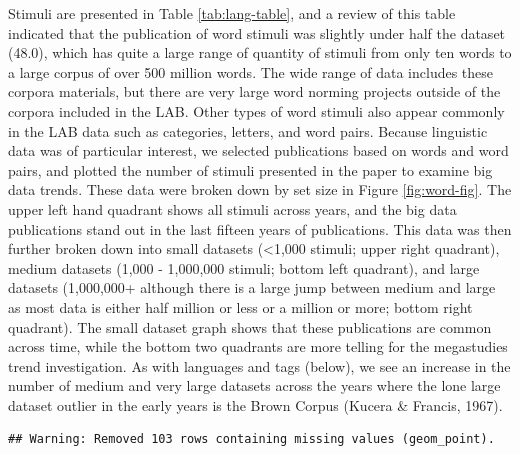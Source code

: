 \documentclass[english,man]{apa6}
\theoremstyle{definition}
\theoremstyle{definition}
\theoremstyle{definition}
\theoremstyle{remark}
\begin{document}
Stimuli are presented in Table \ref{tab:lang-table}, and a review of
this table indicated that the publication of word stimuli was slightly
under half the dataset (48.0), which has quite a large range of quantity
of stimuli from only ten words to a large corpus of over 500 million
words. The wide range of data includes these corpora materials, but
there are very large word norming projects outside of the corpora
included in the LAB. Other types of word stimuli also appear commonly in
the LAB data such as categories, letters, and word pairs. Because
linguistic data was of particular interest, we selected publications
based on words and word pairs, and plotted the number of stimuli
presented in the paper to examine big data trends. These data were
broken down by set size in Figure \ref{fig:word-fig}. The upper left
hand quadrant shows all stimuli across years, and the big data
publications stand out in the last fifteen years of publications. This
data was then further broken down into small datasets (\textless{}1,000
stimuli; upper right quadrant), medium datasets (1,000 - 1,000,000
stimuli; bottom left quadrant), and large datasets (1,000,000+ although
there is a large jump between medium and large as most data is either
half million or less or a million or more; bottom right quadrant). The
small dataset graph shows that these publications are common across
time, while the bottom two quadrants are more telling for the
megastudies trend investigation. As with languages and tags (below), we
see an increase in the number of medium and very large datasets across
the years where the lone large dataset outlier in the early years is the
Brown Corpus (Kucera \& Francis, 1967).

\begin{verbatim}
## Warning: Removed 103 rows containing missing values (geom_point).
\end{verbatim}
\end{document}

